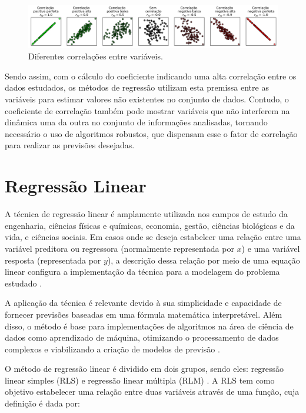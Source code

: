\begin{figure}[H]
	\caption{\label{fig:correlacoes}Diferentes correlações entre variáveis.}
	\begin{center}
		\includegraphics[scale=0.4]{figuras/correlations.png}
	\end{center}
\end{figure}

Sendo assim, com o cálculo do coeficiente indicando uma alta correlação entre os dados estudados, os métodos de regressão utilizam esta premissa entre as variáveis para estimar valores não existentes no conjunto de dados. Contudo, o coeficiente de correlação também pode mostrar variáveis que não interferem na dinâmica uma da outra no conjunto de informações analisadas, tornando necessário o uso de algoritmos robustos, que dispensam esse o fator de correlação para realizar as previsões desejadas. 

\section{Regressão Linear}

A técnica de regressão linear é amplamente utilizada nos campos de estudo da engenharia, ciências físicas e químicas, economia, gestão, ciências biológicas e da vida, e ciências sociais. Em casos onde se deseja estabelcer uma relação entre uma variável preditora ou regressora (normalmente representada por $x$) e uma variável resposta (representada por $y$), a descrição dessa relação por meio de uma equação linear configura a implementação da técnica para a modelagem do problema estudado \cite{montgomery2012}.  

A aplicação da técnica é relevante devido à sua simplicidade e capacidade de fornecer previsões baseadas em uma fórmula matemática interpretável. Além disso, o método é base para implementações de algoritmos na área de ciência de dados como aprendizado de máquina, otimizando o processamento de dados complexos e viabilizando a criação de modelos de previsão \cite{aws2024}.

O método de regressão linear é dividido em dois grupos, sendo eles: regressão linear simples (RLS) e regressão linear múltipla (RLM) \cite{montgomery2012}. A RLS tem como objetivo estabelecer uma relação entre duas variáveis através de uma função, cuja definição é dada por:

